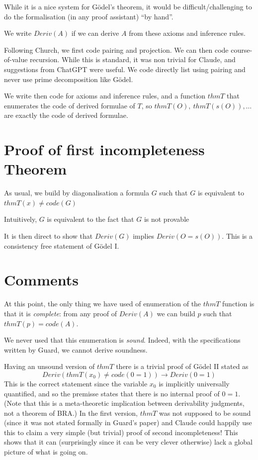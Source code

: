 \documentclass[11pt]{article}
\theoremstyle{plain}
\theoremstyle{definition}
\theoremstyle{remark}
\newcommand{\rta}{\rightarrow}
\begin{document}
While it is a nice system for G\"odel's theorem, it would be difficult/challenging to do the formalisation
(in any proof assistant) ``by hand''.

We write $Deriv(A)$ if we can derive $A$ from these axioms and inference rules.

Following Church, we first code pairing and projection. We can then code course-of-value recursion.
While this is standard, it was non trivial for Claude, and suggestions from ChatGPT were useful.
We code directly list using pairing and never use prime decomposition like G\"odel.

We write then code for axioms and inference rules, and a function $thmT$ that enumerates the code of derived formulae
of $T$, so $thmT(O),~thmT(s(O)),\dots$ are exactly the code of derived formulae.

\section{Proof of first incompleteness Theorem}

As usual, we build by diagonalisation a formula $G$ such that $G$ is equivalent
to $thmT(x)\neq code(G)$

Intuitively, $G$ is equivalent to the fact that $G$ is not provable

It is then direct to show that $Deriv(G)$ implies $Deriv(O=s(O))$. This is a consistency free
statement of G\"odel I.

\section{Comments}

At this point, the only thing we have used of enumeration of the $thmT$ function is that
it is {\em complete}: from any proof of $Deriv(A)$ we can build $p$ such that $thmT(p) = code(A)$.

We never used that this enumeration is {\em sound}. Indeed, with the specifications written
by Guard, we cannot derive soundness.

Having an unsound version of $thmT$ there is a trivial proof of G\"odel II stated
as
$$Deriv(thmT(x_0)\neq code(0=1))\rta Deriv(0=1)$$
This is the correct statement since the variable $x_0$ is implicitly universally quantified, and so the premisse
states that there is no internal proof of $0=1$.
(Note that this is a meta-theoretic implication between derivability judgments, not a theorem of BRA.)
In the first version, $thmT$ was not supposed to be sound (since it was not stated formally in Guard's paper)
and Claude could happily use this to claim a very simple
(but trivial) proof of second incompleteness! This shows that it can (surprisingly since it can be very
clever otherwise) lack a global picture of what is going on.
\end{document}
